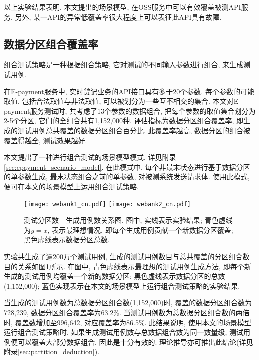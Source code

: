             以上实验结果表明, 本文提出的场景模型, 在OSS服务中可以有效覆盖被测API服务. 另外, 某一API的异常低覆盖率很大程度上可以表征此API具有故障.
        
        \subsection{数据分区组合覆盖率}
        
            \label{sec:partition}
            
            组合测试策略\cite{grindal2005combination}是一种根据组合策略, 它对测试的不同输入参数进行组合, 来生成测试用例.
            
            在E-payment服务中, 实时贷记业务的API接口具有多于20个参数. 每个参数的可能取值, 包括合法取值与非法取值, 可以被划分为一些互不相交的集合. 本文对E-payment服务测试时, 共考虑了13个参数的数据组合, 把每个参数的取值集合划分为2-5个分区,  它们的全组合共有1,152,000种. 评估指标为数据分区组合覆盖率, 即生成的测试用例总共覆盖的数据分区组合百分比. 此覆盖率越高, 数据分区的组合被覆盖得越全, 测试效果越好. 
            
            本文提出了一种进行组合测试的场景模型模式, 详见附录\ref{sec:epayment_scenario_model}. 在此模式中, 每个非最末状态进行基于数据分区的单参数生成, 最末状态组合之前的单参数, 对被测系统发送请求体. 使用此模式, 便可在本文的场景模型上运用组合测试策略.
            
            \begin{figure}[!hbp]
                \centering
                \texttt{[image: webank1\_cn.pdf]}
                \texttt{[image: webank2\_cn.pdf]}
                \caption{测试分区数 - 生成用例数关系图. 图中, 实线表示实验结果; 青色虚线为$y=x$, 表示最理想情况, 即每个生成用例贡献一个新数据分区覆盖; 黑色虚线表示数据分区总数.}
                \label{fig:partition}
            \end{figure}
            
            实验共生成了逾200万个测试用例, 生成的测试用例数目与总共覆盖的分区组合数目的关系如图\ref{fig:partition}所示. 在图中, 青色虚线表示最理想的测试用例生成方法, 即每个新生成的测试用例均覆盖一个新的数据分区; 黑色虚线表示数据分区的总数(1,152,000); 蓝色实现表示在本文的场景模型上运行组合测试策略的实验结果.
            
            当生成的测试用例数为总数据分区组合数(1,152,000)时, 覆盖的数据分区组合数为728,239, 数据分区组合覆盖率为63.2\%. 当测试用例数为总数据分区组合数的两倍时, 覆盖数增加至996,642, 对应覆盖率为86.5\%. 此结果说明, 使用本文的场景模型运行组合测试策略时, 如果生成测试用例数与总数据组合数为同一数量级, 测试用例便可以覆盖大部分数据组合, 因此是十分有效的. 理论推导亦可推出此结论(详见附录\ref{sec:partition_deduction}).
    
